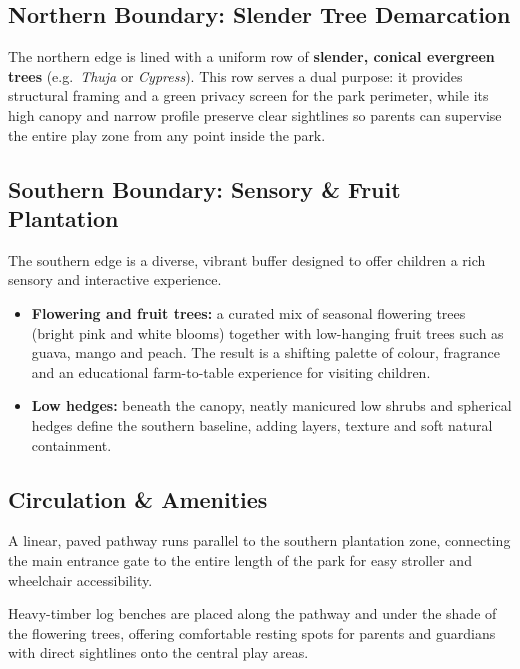 \documentclass[11pt,a4paper]{article}
\begin{document}
\subsection{Northern Boundary: Slender Tree Demarcation}
The northern edge is lined with a uniform row of \textbf{slender, conical evergreen trees} (e.g.\ \emph{Thuja} or \emph{Cypress}). This row serves a dual purpose: it provides structural framing and a green privacy screen for the park perimeter, while its high canopy and narrow profile preserve clear sightlines so parents can supervise the entire play zone from any point inside the park.

\subsection{Southern Boundary: Sensory \& Fruit Plantation}
The southern edge is a diverse, vibrant buffer designed to offer children a rich sensory and interactive experience.
\begin{itemize}
  \item \textbf{Flowering and fruit trees:} a curated mix of seasonal flowering trees (bright pink and white blooms) together with low-hanging fruit trees such as guava, mango and peach. The result is a shifting palette of colour, fragrance and an educational farm-to-table experience for visiting children.
  \item \textbf{Low hedges:} beneath the canopy, neatly manicured low shrubs and spherical hedges define the southern baseline, adding layers, texture and soft natural containment.
\end{itemize}

\subsection{Circulation \& Amenities}
\begin{description}[font=\normalfont\bfseries,leftmargin=2.8cm]
  \item[Pedestrian Walkway] A linear, paved pathway runs parallel to the southern plantation zone, connecting the main entrance gate to the entire length of the park for easy stroller and wheelchair accessibility.
  \item[Rustic Seating] Heavy-timber log benches are placed along the pathway and under the shade of the flowering trees, offering comfortable resting spots for parents and guardians with direct sightlines onto the central play areas.
\end{description}
\end{document}
